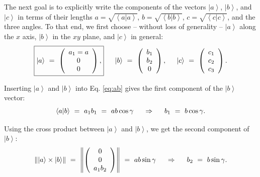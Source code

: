 
The next goal is to explicitly write the components of the vectors $\left| a \right>$, $\left| b \right>$, and $\left| c \right>$ 
in terms of their lengths $a = \sqrt{\left< a | a \right>}$, $b = \sqrt{\left< b | b \right>}$, $c = \sqrt{\left< c | c \right>}$,
and the three angles.
To that end, we first choose -- without loss of generality -- $\left| a \right>$ along the $x$ axis, $\left| b \right>$ in the 
$xy$ plane, and $\left| c \right>$ in general:
\begin{equation} 
	\boxed{ \left| a \right> \ =\  \left( \begin{array}{c} a_1 = a \\ 0 \\ 0 \end{array} \right), }
	\hspace{0.5cm} \left| b \right> \ =\  \left( \begin{array}{c} b_1 \\ b_2 \\ 0 \end{array} \right),
	\hspace{0.5cm} \left| c \right> \ =\  \left( \begin{array}{c} c_1 \\ c_2 \\ c_3 \end{array} \right).
\end{equation}


Inserting $\left| a \right>$ and $\left| b \right>$ into Eq. \ref{eq:ab} gives the first component
of the $\left| b \right>$ vector:
\begin{equation} \left< a | b \right > \ =\  a_1 b_1 \ =\  ab \cos \gamma
\hspace{0.5cm} \Rightarrow \hspace{0.5cm} b_1 \ =\  b \cos \gamma. \end{equation}


Using the cross product between $\left| a \right>$ and $\left| b \right>$, we get the second component of $\left| b \right>$:
\begin{equation} 
	\left\Vert \left| a \right> \times \left| b \right> \right\Vert \ =\ 
	\left\Vert \left( \begin{array}{c} 0 \\ 0 \\ a_1 b_2 \end{array} \right) \right\Vert \ =\ 
	ab \sin \gamma \label{eq:crossab}
	\hspace{0.5cm} \Rightarrow \hspace{0.5cm} b_2 \ =\  b \sin \gamma.
\end{equation}

